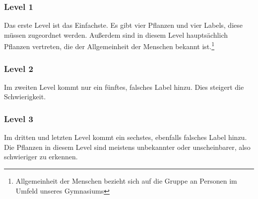 \subsubsection{Level 1}
Das erste Level ist das Einfachste. Es gibt vier Pflanzen und vier Labels, diese müssen zugeordnet werden. Außerdem sind in diesem Level hauptsächlich Pflanzen vertreten, die der Allgemeinheit der Menschen bekannt ist.\footnote{Allgemeinheit der Menschen bezieht sich auf die Gruppe an Personen im Umfeld unseres Gymnasiums}
\subsubsection{Level 2}
Im zweiten Level kommt nur ein fünftes, falsches Label hinzu. Dies steigert die Schwierigkeit.
\subsubsection{Level 3}
Im dritten und letzten Level kommt ein sechstes, ebenfalls falsches Label hinzu. Die Pflanzen in diesem Level sind meistens unbekannter oder unscheinbarer, also schwieriger zu erkennen.

